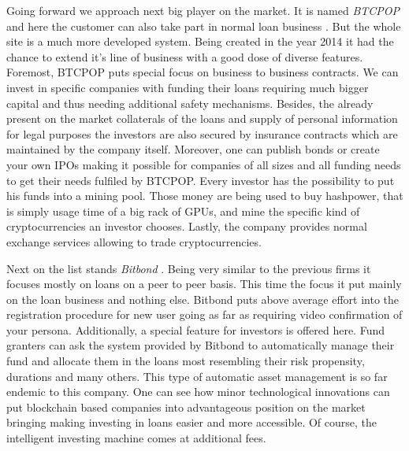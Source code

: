 \documentclass[a4paper,12pt,twoside,openany]{report}
\begin{document}
Going forward we approach next big player on the market. It is named \textit{BTCPOP} and here the customer can also take part in normal loan business \cite{btcpop}. But the whole site is a much more developed system. Being created in the year 2014 it had the chance to extend it's line of business with a good dose of diverse features. Foremost, BTCPOP puts special focus on business to business contracts. We can invest in specific companies with funding their loans requiring much bigger capital and thus needing additional safety mechanisms. Besides, the already present on the market collaterals of the loans and supply of personal information for legal purposes the investors are also secured by insurance contracts which are maintained by the company itself. Moreover, one can publish bonds or create your own IPOs making it possible for companies of all sizes and all funding needs to get their needs fulfiled by BTCPOP. Every investor has the possibility to put his funds into a mining pool. Those money are being used to buy hashpower, that is simply usage time of a big rack of GPUs, and mine the specific kind of cryptocurrencies an investor chooses. Lastly, the company provides normal exchange services allowing to trade cryptocurrencies.

Next on the list stands \textit{Bitbond} \cite{bitbond}. Being very similar to the previous firms it focuses mostly on loans on a peer to peer basis. This time the focus it put mainly on the loan business and nothing else. Bitbond puts above average effort into the registration procedure for new user going as far as requiring video confirmation of your persona. Additionally, a special feature for investors is offered here. Fund granters can ask the system provided by Bitbond to automatically manage their fund and allocate them in the loans most resembling their risk propensity, durations and many others. This type of automatic asset management is so far endemic to this company. One can see how minor technological innovations can put blockchain based companies into advantageous position on the market bringing making investing in loans easier and more accessible. Of course, the intelligent investing machine comes at additional fees.
\end{document}
